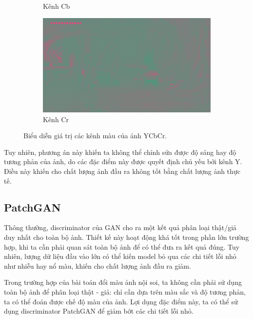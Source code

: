 \documentclass[12pt]{extreport}
\begin{document}
\begin{figure}[H]
\begin{subfigure}[H]{0.3\textwidth}
        \caption{Kênh Cb}
    \end{subfigure}
    \begin{subfigure}[H]{0.3\textwidth}
        \centering
        \includegraphics[width=\linewidth]{figure32.png}
        \caption{Kênh Cr}
    \end{subfigure}
    \caption{Biểu diễn giá trị các kênh màu của ảnh YCbCr.}
    \label{figure_ycbcr}
\end{figure}

Tuy nhiên, phương án này khiến ta không thể chỉnh sửa được độ sáng hay độ tương phản của ảnh, do các đặc điểm này được quyết định chủ yếu bởi kênh Y. Điều này khiến cho chất lượng ảnh đầu ra không tốt bằng chất lượng ảnh thực tế.

\subsection{PatchGAN}
\label{patchgan}

Thông thường, discriminator của GAN cho ra một kết quả phân loại thật/giả duy nhất cho toàn bộ ảnh. Thiết kế này hoạt động khá tốt trong phần lớn trường hợp, khi ta cần phải quan sát toàn bộ ảnh để có thể đưa ra kết quả đúng. Tuy nhiên, lượng dữ liệu đầu vào lớn có thể kiến model bỏ qua các chi tiết lỗi nhỏ như nhiễu hay nổ màu, khiến cho chất lượng ảnh đầu ra giảm.

Trong trường hợp của bài toán đổi màu ảnh nội soi, ta không cần phải sử dụng toàn bộ ảnh để phân loại thật - giả: chỉ cần dựa trên màu sắc và độ tương phản, ta có thể đoán được chế độ màu của ảnh. Lợi dụng đặc điểm này, ta có thể sử dụng discriminator PatchGAN để giảm bớt các chi tiết lỗi nhỏ.
\end{document}
